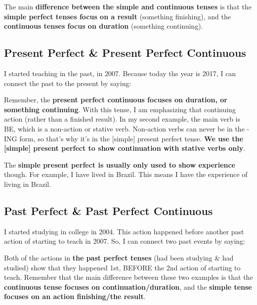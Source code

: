 \documentclass{article}
\begin{document}
The main \textbf{difference between the simple and continuous tenses} is that the \textbf{simple perfect tenses focus on a result} (something finishing), and the \textbf{continuous tenses focus on duration} (something continuing).

\subsection{Present Perfect \& Present Perfect Continuous}

I started teaching in the past, in 2007. Because today the year is 2017, I can connect the past to the present by saying:

\begin{multienumerate}
\end{multienumerate}

Remember, the \textbf{present perfect continuous focuses on duration, or something continuing}. With this tense, I am emphasizing that continuing action (rather than a finished result). In my second example, the main verb is BE, which is a non-action or stative verb. Non-action verbs can never be in the -ING form, so that’s why it’s in the [simple] present perfect tense. \textbf{We use the [simple] present perfect to show continuation with stative verbs only}.

\hfill

The \textbf{simple present perfect is usually only used to show experience} though. For example, I have lived in Brazil. This means I have the experience of living in Brazil.

\subsection{Past Perfect \& Past Perfect Continuous}

I started studying in college in 2004. This action happened before another past action of starting to teach in 2007. So, I can connect two past events by saying:

\begin{multienumerate}
\end{multienumerate}

Both of the actions in \textbf{the past perfect tenses} (had been studying \& had studied) show that they happened 1st, BEFORE the 2nd action of starting to teach. Remember that the main difference between these two examples is that the \textbf{continuous tense focuses on continuation/duration}, and the \textbf{simple tense focuses on an action finishing/the result}.
\end{document}
